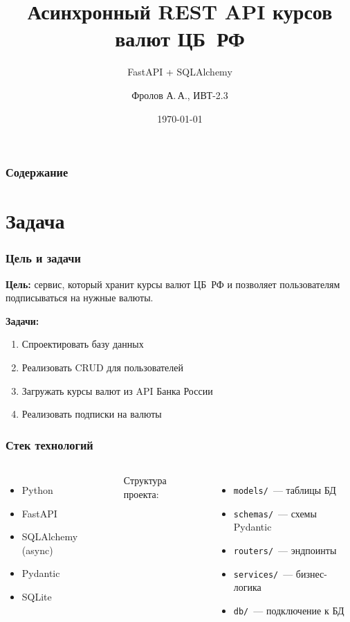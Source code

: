 \documentclass{beamer}
\title[REST API курсов ЦБ~РФ]{Асинхронный REST API курсов валют ЦБ~РФ}
\subtitle{FastAPI + SQLAlchemy}
\author[Фролов А.\,А.]{Фролов А.\,А., ИВТ-2.3}
\institute[РГПУ]{РГПУ им.~А.\,И.~Герцена}
\date{\today}
\begin{document}
\frame{\titlepage}

\begin{frame}
  \frametitle{Содержание}
  \tableofcontents
\end{frame}

\section{Задача}

\begin{frame}
  \frametitle{Цель и задачи}
  \textbf{Цель:} сервис, который хранит курсы валют ЦБ~РФ
  и позволяет пользователям подписываться на нужные валюты.

  \medskip
  \textbf{Задачи:}
  \begin{enumerate}
    \item Спроектировать базу данных
    \item Реализовать CRUD для пользователей
    \item Загружать курсы валют из API Банка России
    \item Реализовать подписки на валюты
  \end{enumerate}
\end{frame}

\begin{frame}
  \frametitle{Стек технологий}
  \begin{columns}[T]
    \begin{itemize}
      \item Python
      \item FastAPI
      \item SQLAlchemy (async)
      \item Pydantic
      \item SQLite
    \end{itemize}

    Структура проекта:
    \begin{itemize}
      \item \texttt{models/}~--- таблицы БД
      \item \texttt{schemas/}~--- схемы Pydantic
      \item \texttt{routers/}~--- эндпоинты
      \item \texttt{services/}~--- бизнес-логика
      \item \texttt{db/}~--- подключение к БД
    \end{itemize}
  \end{columns}
\end{frame}
\end{document}

